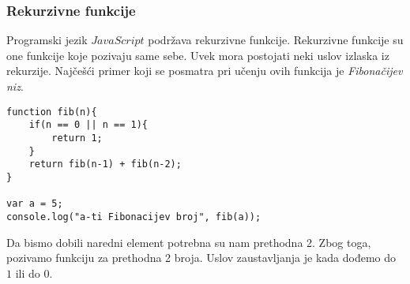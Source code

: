 \subsubsection{Rekurzivne funkcije}
Programski jezik $JavaScript$ podržava rekurzivne funkcije. Rekurzivne funkcije su one funkcije koje pozivaju same sebe. Uvek mora postojati neki uslov izlaska iz rekurzije. Najčešći primer koji se posmatra pri učenju ovih funkcija je \textit{Fibonačijev niz}.
\begin{lstlisting}[backgroundcolor = \color{lightgray}, breaklines=true]
function fib(n){
	if(n == 0 || n == 1){
		return 1;	
	}
	return fib(n-1) + fib(n-2);
}

var a = 5;
console.log("a-ti Fibonacijev broj", fib(a));
\end{lstlisting}
Da bismo dobili naredni element potrebna su nam prethodna 2. Zbog toga, pozivamo funkciju za prethodna 2 broja. Uslov zaustavljanja je kada dođemo do $1$ ili do $0$.

\newpage
